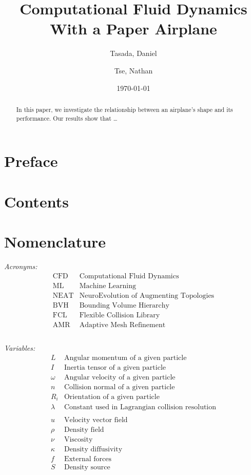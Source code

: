 \documentclass[a4paper,12pt,titlepage]{article}
\title{Computational Fluid Dynamics With a Paper Airplane}
\author{
  Tasada, Daniel\\
  \and
  Tse, Nathan\\
}
\date{\today}
\begin{document}
\maketitle

\begin{abstract}
	In this paper, we investigate the relationship between an airplane's shape
	and its performance. Our results show that \dots
\end{abstract}

\pagebreak
\section{Preface}
\ipsum[1]

\pagebreak
\section{Contents}
\tableofcontents
\pagebreak

\section{Nomenclature}
\textit{Acronyms:}
\[
	\begin{array}{ll}
		\text{CFD} & \text{Computational Fluid Dynamics} \\
		\text{ML} & \text{Machine Learning} \\
		\text{NEAT} & \text{NeuroEvolution of Augmenting Topologies} \\
		\text{BVH} & \text{Bounding Volume Hierarchy} \\
		\text{FCL} & \text{Flexible Collision Library} \\
		\text{AMR} & \text{Adaptive Mesh Refinement} \\
	\end{array}
\] \\

\textit{Variables:}
\[
	\begin{array}{ll}
		L & \text{Angular momentum of a given particle} \\
		I & \text{Inertia tensor of a given particle} \\
		\omega & \text{Angular velocity of a given particle} \\
		n & \text{Collision normal of a given particle} \\
		R_i & \text{Orientation of a given particle} \\
		\lambda & \text{Constant used in Lagrangian collision resolution} \\

		\\

		u & \text{Velocity vector field} \\
		\rho & \text{Density field} \\
		\nu & \text{Viscosity} \\
		\kappa & \text{Density diffusivity} \\
		f & \text{External forces} \\
		S & \text{Density source}
	\end{array}
\]
\pagebreak
\end{document}
